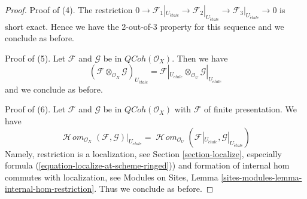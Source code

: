 \documentclass[10pt,a4paper]{amsart}
\theoremstyle{plain}
\theoremstyle{definition}
\theoremstyle{remark}
\numberwithin{equation}{subsection}
\def\SheafHom{\mathop{\mathcal{H}\!\mathit{om}}\nolimits}
\def\etale{{\acute{e}tale}}
\def\QCoh{\mathit{QCoh}}
\begin{document}
\begin{proof}
\medskip\noindent
Proof of (4). The restriction
$0 \to \mathcal{F}_1|_{U_\etale} \to \mathcal{F}_2|_{U_\etale}
\to \mathcal{F}_3|_{U_\etale} \to 0$
is short exact. Hence we have the 2-out-of-3 property
for this sequence and we conclude as before.

\medskip\noindent
Proof of (5). Let $\mathcal{F}$ and $\mathcal{G}$ be in $\QCoh(\mathcal{O}_X)$.
Then we have
$$
(\mathcal{F} \otimes_{\mathcal{O}_X} \mathcal{G})_{U_\etale} =
\mathcal{F}|_{U_\etale} \otimes_{\mathcal{O}_U} \mathcal{G}|_{U_\etale}
$$
and we conclude as before.

\medskip\noindent
Proof of (6). Let $\mathcal{F}$ and $\mathcal{G}$
be in $\QCoh(\mathcal{O}_X)$ with $\mathcal{F}$
of finite presentation. We have
$$
\SheafHom_{\mathcal{O}_X}(\mathcal{F}, \mathcal{G})|_{U_\etale} =
\SheafHom_{\mathcal{O}_U}(\mathcal{F}|_{U_\etale}, \mathcal{G}|_{U_\etale})
$$
Namely, restriction is a localization, see
Section \ref{section-localize}, especially formula
(\ref{equation-localize-at-scheme-ringed})) and formation of internal
hom commutes with localization, see
Modules on Sites, Lemma \ref{sites-modules-lemma-internal-hom-restriction}.
Thus we conclude as before.
\end{proof}
\end{document}
